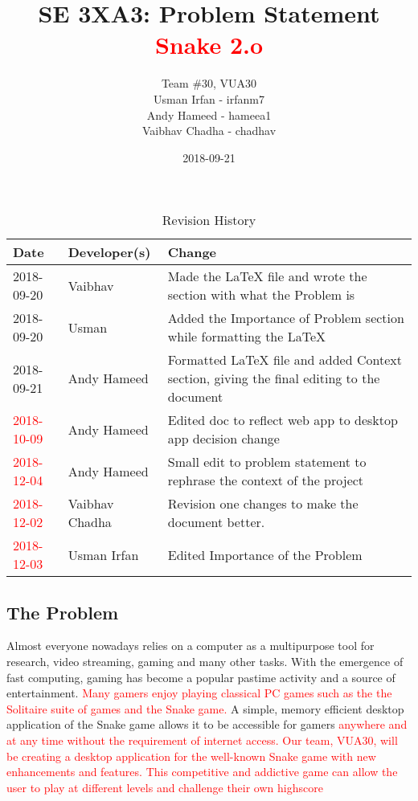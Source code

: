 \documentclass{article}
\title{SE 3XA3: Problem Statement\\ \textbf{\textcolor{red}{Snake 2.o}}}
\author{Team \#30, VUA30
		\\ Usman Irfan - irfanm7
		\\ Andy Hameed - hameea1
		\\ Vaibhav Chadha - chadhav
}
\date{2018-09-21}
\begin{document}
\begin{table}[hp]
\caption{Revision History} \label{TblRevisionHistory}
\begin{tabularx}{\textwidth}{llX}
\toprule
\textbf{Date} & \textbf{Developer(s)} & \textbf{Change}\\
\midrule
2018-09-20 & Vaibhav & Made the LaTeX file and wrote the section with what the Problem is\\
2018-09-20 & Usman & Added the Importance of Problem section while formatting the LaTeX\\
2018-09-21 & Andy Hameed & Formatted LaTeX file and added Context section, giving the final editing to the document\\
\textcolor{red}{2018-10-09} & Andy Hameed & Edited doc to reflect web app to desktop app decision change\\
\textcolor{red}{2018-12-04} & Andy Hameed & Small edit to problem statement to rephrase the context of the project\\
\textcolor{red}{2018-12-02} & Vaibhav Chadha & Revision one changes to make the document better.\\
\textcolor{red}{2018-12-03} & Usman Irfan & Edited Importance of the Problem\\
\bottomrule
\end{tabularx}
\end{table}

\newpage

\maketitle

\subsection*{The Problem}

Almost everyone nowadays relies on a computer as a multipurpose tool for research, video streaming, gaming and many other tasks. With the emergence of fast computing, gaming has become a popular pastime activity and a source of entertainment. \textcolor{red}{Many gamers enjoy playing classical PC games such as the the Solitaire suite of games and the Snake game.} A simple, memory efficient desktop application of the Snake game allows it to be accessible for gamers \textcolor{red}{anywhere and at any time without the requirement of internet access. Our team, VUA30, will be creating a desktop application for the well-known Snake game with new enhancements and features. This competitive and addictive game can allow the user to play at \textcolor{red}{different levels and challenge their own highscore} }
\end{document}
